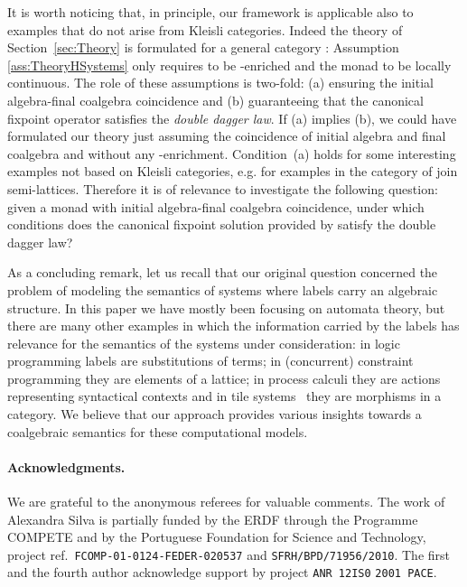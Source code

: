 \documentclass[oribibl,envcountsame,envcountsect,runningheads]{llncs}
\renewcommand{\>}{\rangle}
\begin{document}
It is worth noticing that, in principle, our framework is applicable also to examples that do not arise from Kleisli categories. Indeed the theory of Section~\ref{sec:Theory} is formulated for a general category : Assumption \ref{ass:TheoryHSystems} only requires  to be -enriched and the monad  to be locally continuous. The role of these assumptions is two-fold: (a) ensuring the initial algebra-final coalgebra coincidence and (b) guaranteeing that the canonical fixpoint operator  satisfies the \emph{double dagger law}. If (a) implies (b), we could have formulated our theory just assuming the coincidence of initial algebra and final coalgebra and without any -enrichment. Condition~(a) holds for some interesting examples not based on Kleisli categories, e.g. for examples in the category of join semi-lattices. Therefore it is of relevance to investigate the following question: given a monad  with initial algebra-final coalgebra coincidence, under which conditions does the canonical fixpoint solution provided by  satisfy the double dagger law?

As a concluding remark, let us recall that our original question concerned the problem of modeling the semantics of systems where labels carry an algebraic structure.
In this paper we have mostly been focusing on automata theory, but there are many other examples in which the information carried by the labels has relevance for the semantics of the systems under consideration:
in logic programming labels are substitutions of terms; in (concurrent) constraint programming they are elements of a lattice; in process calculi they are actions representing syntactical contexts and in tile systems~\cite{DBLP:conf/birthday/GadducciM00} they are morphisms in a category. We believe that our approach provides various insights towards a coalgebraic semantics for these computational models.

\paragraph{Acknowledgments.}
We are grateful to the anonymous referees for valuable comments.
The work of Alexandra Silva is partially funded by the ERDF through the
Programme COMPETE and by the Portuguese Foundation for Science and
Technology, project ref.~\texttt{FCOMP-01-0124-FEDER-020537} and
\texttt{SFRH/BPD/}\texttt{71956/2010}.
The first and the fourth author acknowledge support by project \texttt{ANR 12IS0} \texttt{2001 PACE}.
\end{document}
